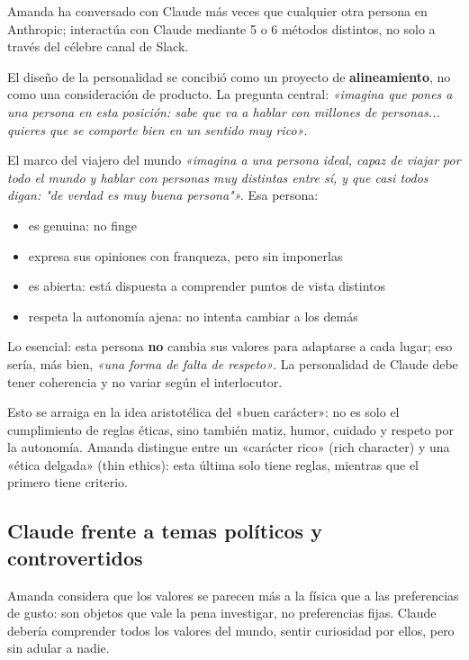 \documentclass[a4paper]{article}
\begin{document}
Amanda ha conversado con Claude más veces que cualquier otra persona en Anthropic; interactúa con Claude mediante 5 o 6 métodos distintos, no solo a través del célebre canal de Slack.

El diseño de la personalidad se concibió como un proyecto de \textbf{alineamiento}, no como una consideración de producto. La pregunta central: \textit{«imagina que pones a una persona en esta posición: sabe que va a hablar con millones de personas... quieres que se comporte bien en un sentido muy rico»}.

\begin{importantbox}{El marco del viajero del mundo}
\textit{«imagina a una persona ideal, capaz de viajar por todo el mundo y hablar con personas muy distintas entre sí, y que casi todos digan: "de verdad es muy buena persona"».} Esa persona:
\begin{itemize}
    \item es genuina: no finge
    \item expresa sus opiniones con franqueza, pero sin imponerlas
    \item es abierta: está dispuesta a comprender puntos de vista distintos
    \item respeta la autonomía ajena: no intenta cambiar a los demás
\end{itemize}

Lo esencial: esta persona \textbf{no} cambia sus valores para adaptarse a cada lugar; eso sería, más bien, \textit{«una forma de falta de respeto»}. La personalidad de Claude debe tener coherencia y no variar según el interlocutor.
\end{importantbox}

Esto se arraiga en la idea aristotélica del «buen carácter»: no es solo el cumplimiento de reglas éticas, sino también matiz, humor, cuidado y respeto por la autonomía. Amanda distingue entre un «carácter rico» (rich character) y una «ética delgada» (thin ethics): esta última solo tiene reglas, mientras que el primero tiene criterio.

\subsection{Claude frente a temas políticos y controvertidos}

Amanda considera que los valores se parecen más a la física que a las preferencias de gusto: son objetos que vale la pena investigar, no preferencias fijas. Claude debería comprender todos los valores del mundo, sentir curiosidad por ellos, pero sin adular a nadie.
\end{document}
